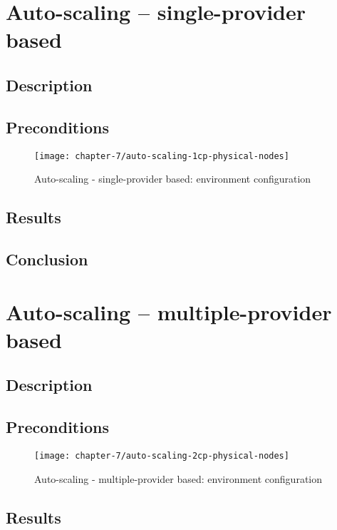\section{Auto-scaling -- single-provider based}
\subsection*{Description}
\subsection*{Preconditions}
\begin{figure}[!ht]
  \begin{center}
    \texttt{[image: chapter-7/auto-scaling-1cp-physical-nodes]}
  \end{center}
  \caption{Auto-scaling - single-provider based: environment configuration}
  \label{eval:auto-scaling-1cp-physical-nodes}
\end{figure}

\subsection*{Results}
\subsection*{Conclusion}

\section{Auto-scaling -- multiple-provider based}
\subsection*{Description}
\subsection*{Preconditions}
\begin{figure}[!ht]
  \begin{center}
    \texttt{[image: chapter-7/auto-scaling-2cp-physical-nodes]}
  \end{center}
  \caption{Auto-scaling - multiple-provider based: environment configuration}
  \label{eval:auto-scaling-1cp-physical-nodes}
\end{figure}

\subsection*{Results}
